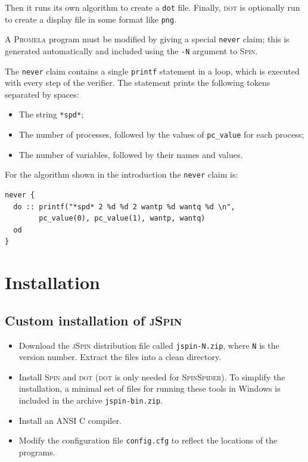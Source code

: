 \documentclass[11pt]{article}
\newcommand{\spn}{\textsc{Spin}}
\newcommand{\prm}{\textsc{Promela}}
\newcommand{\js}{\textsc{jSpin}}
\newcommand{\dt}{\textsc{dot}}
\newcommand{\dtf}{\texttt{dot}}
\newcommand{\p}[1]{\texttt{#1}}
\begin{document}
Then it runs its own algorithm to create a \dtf{} file. Finally, \dt{} is 
optionally run to create a display file in some format like \p{png}.

A \prm{} program must be modified by giving a special \p{never} claim; this is
generated automatically and included using the \p{-N} argument to \spn{}. 

The \p{never} claim contains a single \p{printf} statement in a loop, which is 
executed with every step of the verifier. The statement prints the 
following tokens separated by spaces:
\begin{itemize}
\item The string \p{*spd*};
\item The number of processes, followed by the values of \p{pc\_value}
for each process;
\item The number of variables, followed by their names and values.
\end{itemize}
For the algorithm shown in the introduction the \p{never} claim is:
\begin{verbatim}
never {
  do :: printf("*spd* 2 %d %d 2 wantp %d wantq %d \n",
        pc_value(0), pc_value(1), wantp, wantq)
  od
}
\end{verbatim}

\newpage

\appendix

\section{Installation}\label{a.install}

\subsection{Custom installation of \js{}}
\begin{itemize}
\item Download the \js{} distribution file called \p{jspin-N.zip},
where \p{N} is the version number.
Extract the files into a clean directory.

\item Install \spn{} and \textsc{dot} (\textsc{dot} is only needed for
\textsc{SpinSpider}).
To simplify the installation, a minimal set of files 
for running these tools in Windows is included in the archive \p{jspin-bin.zip}.

\item Install an ANSI C compiler.

\item Modify the configuration file \p{config.cfg} to reflect the
locations of the programs.
\end{itemize}
\end{document}
